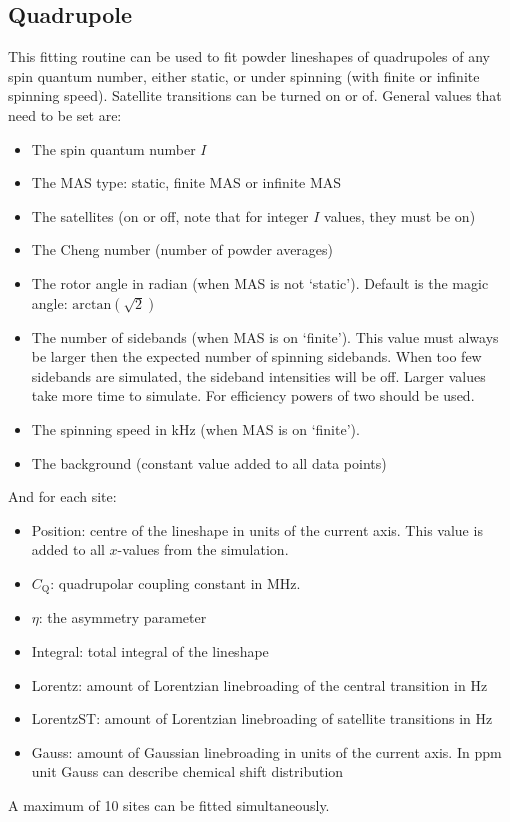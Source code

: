 \documentclass[11pt,a4paper]{article}
\begin{document}
\subsection{Quadrupole}
This fitting routine can be used to fit powder lineshapes of quadrupoles of any spin quantum number,
either static, or under spinning (with finite or infinite spinning speed). Satellite transitions can
be turned on or of. General values that need to be set are:
\begin{itemize}
\item The spin quantum number $I$ 
\item The MAS type: static, finite MAS or infinite MAS
\item The satellites (on or off, note that for integer $I$ values, they must be on)
\item The Cheng number (number of powder averages)
\item The rotor angle in radian (when MAS is not `static'). Default is the magic angle:
	 $\text{arctan}(\sqrt{2})$
\item The number of sidebands (when MAS is on `finite'). This value must always be larger then the
  expected number of spinning sidebands. When too few sidebands are simulated, the sideband intensities 
will be off. Larger values take more time to simulate. For efficiency powers of two should be used.
\item The spinning speed in kHz (when MAS is on `finite').
\item The background (constant value added to all data points)
\end{itemize}
And for each site:
\begin{itemize}
\item Position: centre of the lineshape in units of the current axis. This value is added to all 
          $x$-values from the simulation. 
\item $C_\text{Q}$: quadrupolar coupling constant in MHz.
\item $\eta$: the asymmetry parameter
\item Integral: total integral of the lineshape
\item Lorentz: amount of Lorentzian linebroading of the central transition in Hz
\item LorentzST: amount of Lorentzian linebroading of satellite transitions in Hz
\item Gauss: amount of Gaussian linebroading in units of the current axis. In ppm unit Gauss can 
describe chemical shift distribution
\end{itemize}
A maximum of 10 sites can be fitted simultaneously.
\end{document}
